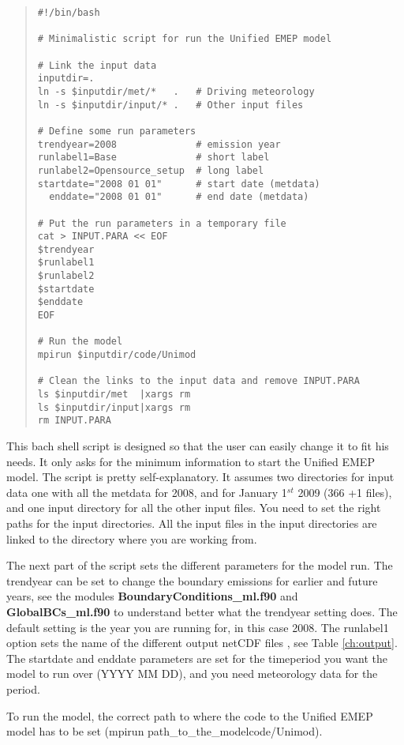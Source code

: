 \begin{quote}
\begin{verbatim}
#!/bin/bash

# Minimalistic script for run the Unified EMEP model

# Link the input data
inputdir=.
ln -s $inputdir/met/*   .   # Driving meteorology
ln -s $inputdir/input/* .   # Other input files

# Define some run parameters
trendyear=2008              # emission year
runlabel1=Base              # short label
runlabel2=Opensource_setup  # long label
startdate="2008 01 01"      # start date (metdata)
  enddate="2008 01 01"      # end date (metdata)

# Put the run parameters in a temporary file
cat > INPUT.PARA << EOF
$trendyear
$runlabel1
$runlabel2
$startdate
$enddate
EOF

# Run the model
mpirun $inputdir/code/Unimod

# Clean the links to the input data and remove INPUT.PARA
ls $inputdir/met  |xargs rm
ls $inputdir/input|xargs rm
rm INPUT.PARA

\end{verbatim}
\end{quote}
This bach shell script is designed so that the user can easily 
change it to fit his needs. It only asks for the minimum information 
to start the Unified EMEP model. 
The script is pretty self-explanatory. It assumes two directories for input data 
one with all the metdata for 2008, and for January 1$^{st}$ 2009 (366 +1 files), 
and one input directory for all the other input files. You need to set the right paths 
for the input directories.  
All the input files in the input directories are linked to the directory where you are working from. 
  

The next part of the script sets the different parameters for the model run. 
The trendyear can be set to change the boundary emissions for 
earlier and future years, see the modules {\bf BoundaryConditions\_ml.f90 } 
and {\bf GlobalBCs\_ml.f90 } to understand better what the trendyear 
setting does. The default setting is the year you are running for, in this case 
2008. 
The runlabel1 option sets the name of the different output netCDF 
files , see Table \ref{ch:output}. 
The startdate and enddate parameters are set for the timeperiod you want the model 
to run over (YYYY MM DD), and you need meteorology data for the period.

To run the model, the correct path to where the code to the Unified EMEP model 
has to be set (mpirun path\_to\_the\_modelcode/Unimod).  

